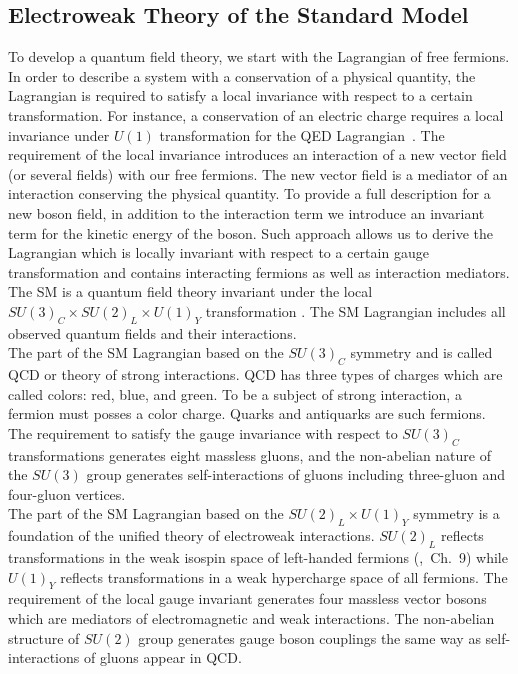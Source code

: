 \subsection{Electroweak Theory of the Standard Model}
\label{sec:WgAbout_SMEWK}

To develop a quantum field theory, we start with the Lagrangian of free fermions. In order to describe a system with a conservation of a physical quantity, the Lagrangian is required to satisfy a local invariance with respect to a certain transformation. For instance, a conservation of an electric charge requires a local invariance under $U(1)$ transformation for the QED Lagrangian~\cite{ref_Pich}. The requirement of the local invariance introduces an interaction of a new vector field (or several fields) with our free fermions. The new vector field is a mediator of an interaction conserving the physical quantity. To provide a full description for a new boson field, in addition to the interaction term we introduce an invariant term for the kinetic energy of the boson. Such approach allows us to derive the Lagrangian which is locally invariant with respect to a certain gauge transformation and contains interacting fermions as well as interaction mediators. \\ 

The SM is a quantum field theory invariant under the local $SU(3)_C \times SU(2)_L \times U(1)_Y$ transformation \cite{ref_Pich}. The SM Lagrangian includes all observed quantum fields and their interactions. \\ 

The part of the SM Lagrangian based on the $SU(3)_C$ symmetry and is called QCD or theory of strong interactions. QCD has three types of charges which are called colors: red, blue, and green. To be a subject of strong interaction, a fermion must posses a color charge. Quarks and antiquarks are such fermions. The requirement to satisfy the gauge invariance with respect to $SU(3)_C$ transformations generates eight massless gluons, and the non-abelian nature of the $SU(3)$ group generates self-interactions of gluons including three-gluon and four-gluon vertices.\\

The part of the SM Lagrangian based on the $SU(2)_L \times U(1)_Y$ symmetry is a foundation of the unified theory of electroweak interactions. $SU(2)_L$ reflects transformations in the weak isospin space of left-handed fermions (\cite{ref_Griffiths},~Ch.~9) while $U(1)_Y$ reflects transformations in a weak hypercharge space of all fermions. The requirement of the local gauge invariant generates four massless vector bosons which are mediators of electromagnetic and weak interactions. The non-abelian structure of $SU(2)$ group generates gauge boson couplings the same way as self-interactions of gluons appear in QCD.\\ 

